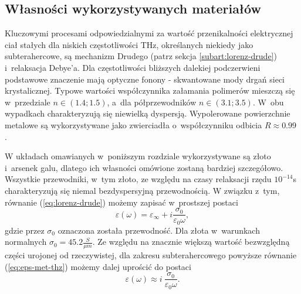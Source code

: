 \subsection{Własności wykorzystywanych materiałów}
\label{subart:thzmat}
Kluczowymi procesami odpowiedzialnymi za wartość przenikalności elektrycznej ciał stałych dla niskich częstotliwości THz, określanych niekiedy jako subterahercowe, są mechanizm Drudego (patrz sekcja \ref{subart:lorenz-drude}) i~relaksacja Debye'a. Dla częstotliwości bliższych dalekiej podczerwieni podstawowe znaczenie mają optyczne fonony - skwantowane mody drgań sieci krystalicznej. Typowe wartości współczynnika załamania polimerów mieszczą się w~przedziale $n \in (1.4;1.5)$, a~dla półprzewodników $n\in (3.1;3.5)$. W~obu wypadkach charakteryzują się niewielką dyspersją. Wypolerowane powierzchnie metalowe są wykorzystywane jako zwierciadła o~współczynniku odbicia $R\approx 0.99$ \cite{lee2009principles}.

W układach omawianych w~poniższym rozdziale wykorzystywane są złoto i~arsenek galu, dlatego ich własności omówione zostaną bardziej szczegółowo. Wszystkie przewodniki, w~tym złoto, ze względu na czasy relaksacji rzędu $10^{-14}$s charakteryzują się niemal bezdyspersyjną przewodnością. W związku z~tym, równanie (\ref{eq:lorenz-drude}) możemy zapisać w~prostszej postaci
\begin{equation}
	\varepsilon(\omega)=\varepsilon_{\infty}+i \frac{\sigma_0}{\varepsilon_0 \omega},
	\label{eq:eps-met-thz}
\end{equation}
gdzie przez $\sigma_0$ oznaczona została przewodność. Dla złota w~warunkach normalnych $\sigma_0=45.2 \frac{S}{\mu m}$.   Ze względu na znacznie większą wartość bezwzględną części urojonej od rzeczywistej, dla zakresu subterahercowego powyższe równanie (\ref{eq:eps-met-thz}) możemy dalej uprościć do postaci
\begin{equation}
	\varepsilon(\omega) \approx i~\frac{\sigma_0}{\varepsilon_0 \omega}.
	\label{eq:eps-met-thz-app}
\end{equation}


